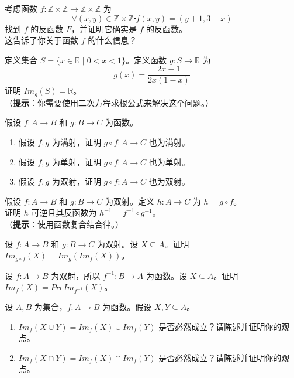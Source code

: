 \begin{exercise}
    考虑函数 $f : \mathbb{Z} \times \mathbb{Z} \to \mathbb{Z} \times \mathbb{Z}$ 为
    \[\forall (x, y) \in \mathbb{Z} \times \mathbb{Z} \centerdot f(x, y) = (y + 1, 3 - x)\]
    找到 $f$ 的反函数 $F$，并证明它确实是 $f$ 的反函数。\\
    这告诉了你关于函数 $f$ 的什么信息？
\end{exercise}

\begin{exercise}
    定义集合 $S = \{x \in \mathbb{R} \mid 0 < x < 1\}$。定义函数 $g:S \to \mathbb{R}$ 为
    \[g(x) = \frac{2x-1}{2x(1-x)}\]
    证明 $Im_g(S) = \mathbb{R}$。\\
    （\textbf{提示}：你需要使用二次方程求根公式来解决这个问题。）
\end{exercise}

\begin{exercise}
    假设 $f : A \to B$ 和 $g : B \to C$ 为函数。
    \begin{enumerate}[label=(\alph*)]
        \item 假设 $f, g$ 为满射，证明 $g \circ f : A \to C$ 也为满射。
        \item 假设 $f, g$ 为单射，证明 $g \circ f : A \to C$ 也为单射。
        \item 假设 $f, g$ 为双射，证明 $g \circ f : A \to C$ 也为双射。
    \end{enumerate}
\end{exercise}

\begin{exercise}
    假设 $f : A \to B$ 和 $g : B \to C$ 为双射。定义 $h : A \to C$ 为 $h = g \circ f$。\\
    证明 $h$ 可逆且其反函数为 $h^{-1} = f^{-1} \circ g^{-1}$。\\
    （\textbf{提示}：使用函数复合结合律。）
\end{exercise}

\begin{exercise}
    设 $f : A \to B$ 和 $g : B \to C$ 为双射。设 $X \subseteq A$。证明 $Im_{g \circ f} (X) = Im_g(Im_f (X))$。
\end{exercise}

\begin{exercise}
    设 $f : A \to B$ 为双射，所以 $f^{-1} : B \to A$ 为函数。设 $X \subseteq A$。证明 $Im_f (X) = PreIm_{f^{-1}} (X)$。
\end{exercise}

\begin{exercise}
    设 $A, B$ 为集合，$f : A \to B$ 为函数。假设 $X,Y \subseteq A$。
    \begin{enumerate}[label=(\alph*)]
        \item $Im_f (X \cup Y) = Im_f (X) \cup Im_f (Y)$ 是否必然成立？请陈述并证明你的观点。
        \item $Im_f (X \cap Y) = Im_f (X) \cap Im_f (Y)$ 是否必然成立？请陈述并证明你的观点。
    \end{enumerate}
\end{exercise}


